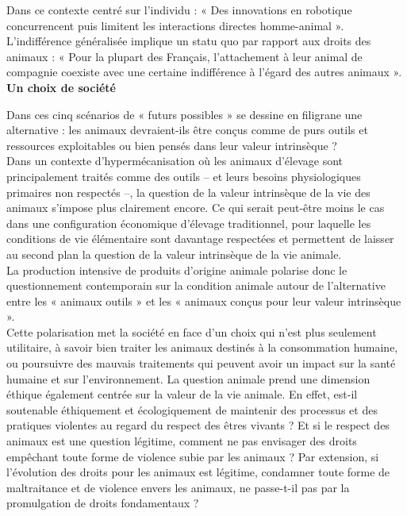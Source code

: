 \documentclass[10pt]{article}
\begin{document}
Dans ce contexte centré sur l’individu : « Des innovations en robotique concurrencent puis limitent les interactions directes homme-animal ». L’indifférence généralisée implique un statu quo par rapport aux droits des animaux : « Pour la plupart des Français, l’attachement à leur animal de compagnie coexiste avec une certaine indifférence à l’égard des autres animaux ».\\

\textbf{Un choix de société}

Dans ces cinq scénarios de « futurs possibles » se dessine en filigrane une alternative : les animaux devraient-ils être conçus comme de purs outils et ressources exploitables ou bien pensés dans leur valeur intrinsèque ?\\

Dans un contexte d’hypermécanisation où les animaux d’élevage sont principalement traités comme des outils – et leurs besoins physiologiques primaires non respectés –, la question de la valeur intrinsèque de la vie des animaux s’impose plus clairement encore. Ce qui serait peut-être moins le cas dans une configuration économique d’élevage traditionnel, pour laquelle les conditions de vie élémentaire sont davantage respectées et permettent de laisser au second plan la question de la valeur intrinsèque de la vie animale.\\

La production intensive de produits d’origine animale polarise donc le questionnement contemporain sur la condition animale autour de l’alternative entre les « animaux outils » et les « animaux conçus pour leur valeur intrinsèque ».\\

Cette polarisation met la société en face d’un choix qui n’est plus seulement utilitaire, à savoir bien traiter les animaux destinés à la consommation humaine, ou poursuivre des mauvais traitements qui peuvent avoir un impact sur la santé humaine et sur l’environnement. La question animale prend une dimension éthique également centrée sur la valeur de la vie animale. En effet, est-il soutenable éthiquement et écologiquement de maintenir des processus et des pratiques violentes au regard du respect des êtres vivants ? Et si le respect des animaux est une question légitime, comment ne pas envisager des droits empêchant toute forme de violence subie par les animaux ? Par extension, si l’évolution des droits pour les animaux est légitime, condamner toute forme de maltraitance et de violence envers les animaux, ne passe-t-il pas par la promulgation de droits fondamentaux ?\\
\end{document}

